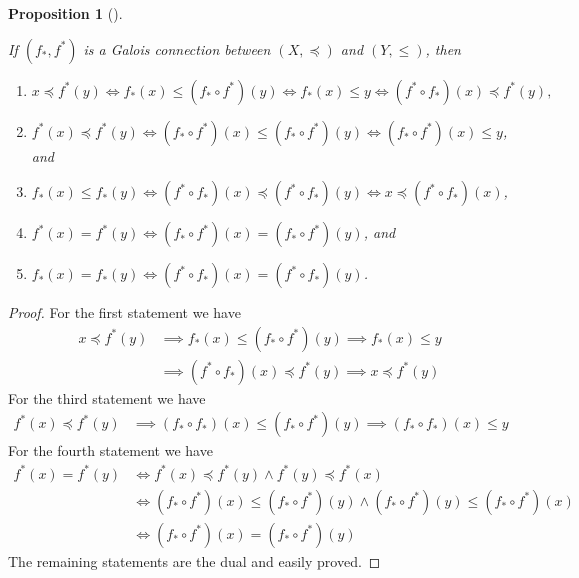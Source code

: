 \documentclass[
  twoside,
  12pt,
  letterpaper,
  fleqn]{article}
\providecommand{\tightlist}{%
  \setlength{\itemsep}{0pt}\setlength{\parskip}{0pt}}\usepackage{longtable,booktabs,array}
\theoremstyle{plain}
\newtheorem{proposition}{Proposition}[section]
\theoremstyle{definition}
\theoremstyle{definition}
\theoremstyle{remark}
\begin{document}
\begin{proposition}[]\protect\hypertarget{prp-galois-connection-property}{}\label{prp-galois-connection-property}

If \((f_*, f^*)\) is a Galois connection between \((X,\preceq)\) and
\((Y,\leqslant)\), then

\begin{enumerate}
\def\labelenumi{\arabic{enumi}.}
\tightlist
\item
  \(x \preceq f^*(y) \Longleftrightarrow f_*(x)\leqslant (f_*\circ f^*)(y) \Longleftrightarrow f_*(x)\leqslant y \Longleftrightarrow (f^*\circ f_*)(x)\preceq f^*(y),\)
\item
  \(f^*(x)\preceq f^*(y)\Longleftrightarrow (f_*\circ f^*)(x)\leqslant (f_*\circ f^*)(y) \Longleftrightarrow (f_*\circ f^*)(x)\leqslant y\),
  and
\item
  \(f_*(x)\leqslant f_*(y) \Longleftrightarrow (f^*\circ f_*)(x)\preceq (f^*\circ f_*)(y) \Longleftrightarrow x\preceq (f^*\circ f_*)(x)\),
\item
  \(f^*(x)=f^*(y) \Longleftrightarrow (f_*\circ f^*)(x)=(f_*\circ f^*)(y)\),
  and
\item
  \(f_*(x)=f_*(y) \Longleftrightarrow (f^*\circ f_*)(x)=(f^*\circ f_*)(y)\).
\end{enumerate}

\end{proposition}

\begin{proof}

For the first statement we have \begin{align*}
x \preceq f^*(y) 
& \implies f_*(x)\leqslant (f_*\circ f^*)(y) 
\implies f_*(x)\leqslant y \\
& \implies (f^*\circ f_*)(x) \preceq f^*(y) 
\implies x\preceq f^*(y)  
\end{align*} For the third statement we have \begin{align*}
f^*(x) \preceq f^*(y) 
& \implies (f_*\circ f_*)(x)\leqslant (f_*\circ f^*)(y) 
 \implies (f_*\circ f_*)(x)\leqslant y 
\end{align*} For the fourth statement we have \begin{align*}
f^*(x)=f^*(y) 
& \Longleftrightarrow f^*(x)\preceq f^*(y) \land f^*(y) \preceq f^*(x) \\
& \Longleftrightarrow (f_*\circ f^*)(x)\leqslant (f_*\circ f^*)(y) \land  (f_*\circ f^*)(y)\leqslant (f_*\circ f^*)(x) \\
& \Longleftrightarrow (f_*\circ f^*)(x)=(f_*\circ f^*)(y) 
\end{align*} The remaining statements are the dual and easily proved.

\end{proof}
\end{document}
